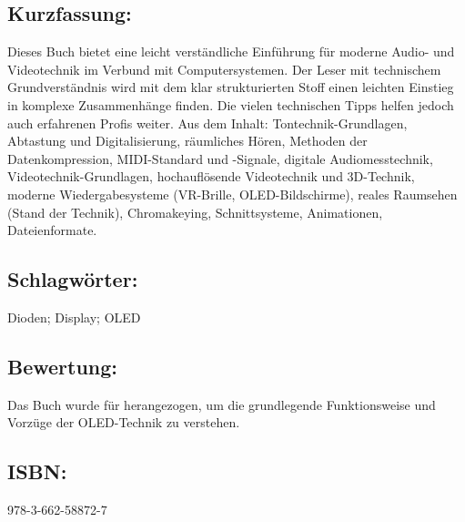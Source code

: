 \begin{minipage}{0.48\textwidth}
\subsection*{Kurzfassung:}
Dieses Buch bietet eine leicht verständliche Einführung für moderne Audio- und Videotechnik im Verbund mit Computersystemen. Der Leser mit technischem Grundverständnis wird mit dem klar strukturierten Stoff einen leichten Einstieg in komplexe Zusammenhänge finden. Die vielen technischen Tipps helfen jedoch auch erfahrenen Profis weiter. Aus dem Inhalt: Tontechnik-Grundlagen, Abtastung und Digitalisierung, räumliches Hören, Methoden der Datenkompression, MIDI-Standard und -Signale, digitale Audiomesstechnik, Videotechnik-Grundlagen, hochauflösende Videotechnik und 3D-Technik, moderne Wiedergabesysteme (VR-Brille, OLED-Bildschirme), reales Raumsehen (Stand der Technik), Chromakeying, Schnittsysteme, Animationen, Dateienformate.	
\end{minipage}
\subsection*{Schlagwörter:}
Dioden; Display; OLED
\subsection*{Bewertung:}
Das Buch wurde für herangezogen, um die grundlegende Funktionsweise und Vorzüge der OLED-Technik zu verstehen.
\subsection*{ISBN:}
978-3-662-58872-7

